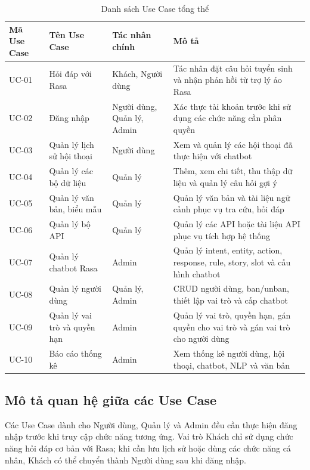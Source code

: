 \documentclass[12pt,a4paper]{report}
\begin{document}
\begin{table}[H]
\centering
\caption{Danh sách Use Case tổng thể}
\label{tab:usecase_list}
\begin{tabular}{|p{1.5cm}|p{4.2cm}|p{3cm}|p{6.3cm}|}
\hline
\textbf{Mã Use Case} & \textbf{Tên Use Case} & \textbf{Tác nhân chính} & \textbf{Mô tả} \\ \hline
UC-01 & Hỏi đáp với Rasa & Khách, Người dùng & Tác nhân đặt câu hỏi tuyển sinh và nhận phản hồi từ trợ lý ảo Rasa \\ \hline
UC-02 & Đăng nhập & Người dùng, Quản lý, Admin & Xác thực tài khoản trước khi sử dụng các chức năng cần phân quyền \\ \hline
UC-03 & Quản lý lịch sử hội thoại & Người dùng & Xem và quản lý các hội thoại đã thực hiện với chatbot \\ \hline
UC-04 & Quản lý các bộ dữ liệu & Quản lý & Thêm, xem chi tiết, thu thập dữ liệu và quản lý câu hỏi gợi ý \\ \hline
UC-05 & Quản lý văn bản, biểu mẫu & Quản lý & Quản lý văn bản và tài liệu ngữ cảnh phục vụ tra cứu, hỏi đáp \\ \hline
UC-06 & Quản lý bộ API & Quản lý & Quản lý các API hoặc tài liệu API phục vụ tích hợp hệ thống \\ \hline
UC-07 & Quản lý chatbot Rasa & Admin & Quản lý intent, entity, action, response, rule, story, slot và cấu hình chatbot \\ \hline
UC-08 & Quản lý người dùng & Quản lý, Admin & CRUD người dùng, ban/unban, thiết lập vai trò và cấp chatbot \\ \hline
UC-09 & Quản lý vai trò và quyền hạn & Admin & Quản lý vai trò, quyền hạn, gán quyền cho vai trò và gán vai trò cho người dùng \\ \hline
UC-10 & Báo cáo thống kê & Admin & Xem thống kê người dùng, hội thoại, chatbot, NLP và văn bản \\ \hline
\end{tabular}
\end{table}

\subsection{Mô tả quan hệ giữa các Use Case}

Các Use Case dành cho Người dùng, Quản lý và Admin đều cần thực hiện đăng nhập trước khi truy cập chức năng tương ứng. Vai trò Khách chỉ sử dụng chức năng hỏi đáp cơ bản với Rasa; khi cần lưu lịch sử hoặc dùng các chức năng cá nhân, Khách có thể chuyển thành Người dùng sau khi đăng nhập.
\end{document}
